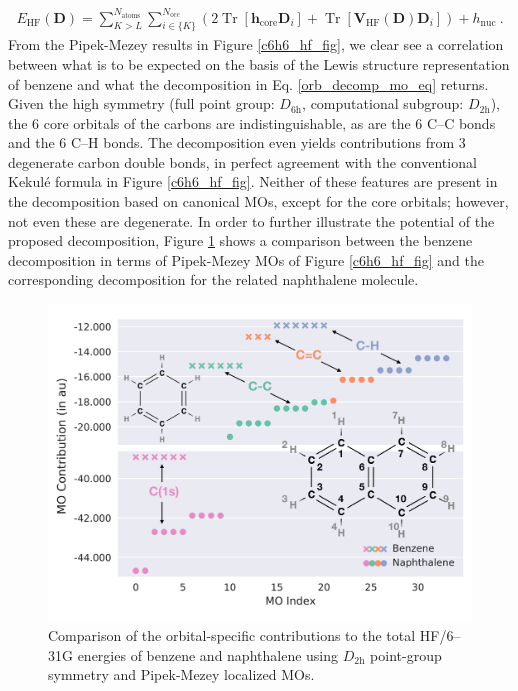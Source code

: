 \documentclass[journal=jctc,manuscript=article]{achemso}
\DeclareMathOperator{\tr}{Tr}
\begin{document}
%
\begin{align}
E_{\text{HF}}(\bm{D}) = \sum^{N_{\text{atoms}}}_{K>L}\sum^{N_{\text{occ}}}_{i \in \{K\}}(2\tr[\bm{h}_{\text{core}}\bm{D}_i] + \tr[\bm{V}_{\text{HF}}(\bm{D})\bm{D}_i]) + h_{\text{nuc}} \ . \label{orb_decomp_bond_eq}
\end{align}
%
From the Pipek-Mezey results in Figure \ref{c6h6_hf_fig}, we clear see a correlation between what is to be expected on the basis of the Lewis structure representation of benzene and what the decomposition in Eq. \ref{orb_decomp_mo_eq} returns. Given the high symmetry (full point group: $D_{6\text{h}}$, computational subgroup: $D_{2\text{h}}$), the 6 core orbitals of the carbons are indistinguishable, as are the 6 C--C bonds and the 6 C--H bonds. The decomposition even yields contributions from 3 degenerate carbon double bonds, in perfect agreement with the conventional Kekul{\'e} formula in Figure \ref{c6h6_hf_fig}. Neither of these features are present in the decomposition based on canonical MOs, except for the core orbitals; however, not even these are degenerate. In order to further illustrate the potential of the proposed decomposition, Figure \ref{c10h8_hf_fig} shows a comparison between the benzene decomposition in terms of Pipek-Mezey MOs of Figure \ref{c6h6_hf_fig} and the corresponding decomposition for the related naphthalene molecule.\\
%
\begin{figure}[ht]
\begin{center}
\includegraphics[width=\textwidth]{figures/c10h8_hf_2.pdf}
\caption{Comparison of the orbital-specific contributions to the total HF/6--31G energies of benzene and naphthalene using $D_{2\text{h}}$ point-group symmetry and Pipek-Mezey localized MOs.}
\label{c10h8_hf_fig}
\end{center}
\end{figure}
%
\end{document}
